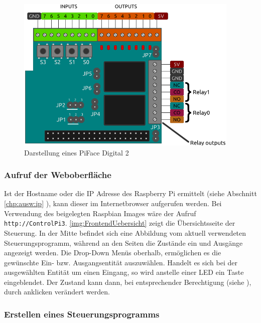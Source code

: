 
 \begin{figure}[H]
 	\begin{center}
 		\includegraphics[width=0.95\textwidth]{./images/pifacedigital2_diagram.png}
 		\caption[Darstellung eines PiFace Digital 2]{Darstellung eines PiFace Digital 2 \cite{URL:Pfd}}
 		\label{img:PiFaceDigital2}
 	\end{center} 
 \end{figure}	

 \subsubsection{Aufruf der Weboberfläche}
Ist der Hostname oder die IP Adresse des Raspberry Pi ermittelt (siehe Abschnitt \ref{chp:ausw:ip} ), kann dieser im Internetbrowser aufgerufen werden. Bei Verwendung des beigelegten Raspbian Images wäre der Aufruf \texttt{http://ControlPi3}. \autoref{img:FrontendUebersicht} zeigt die Übersichtsseite der Steuerung. In der Mitte befindet sich eine Abbildung vom aktuell verwendeten Steuerungsprogramm, während an den Seiten die Zustände ein und Ausgänge angezeigt werden. Die Drop-Down Menüs oberhalb, ermöglichen es die gewünschte Ein- bzw. Ausgangsentität auszuwählen. Handelt es sich bei der ausgewählten Entität um einen Eingang, so wird anstelle einer LED ein Taste eingeblendet. Der Zustand kann dann, bei entsprechender Berechtigung (siehe  ), durch anklicken verändert werden.  
\subsubsection{Erstellen eines Steuerungsprogramms}

